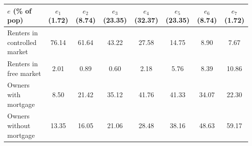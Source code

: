 \begin{table}[p]
\scriptsize
\renewcommand{\arraystretch}{1.2}
\begin{center}
\begin{tabular}{lccccccc}
\toprule
$e$ (\% of pop) & $e_{1}$ (1.72)& $e_{2}$ (8.74)& $e_{3}$ (23.35)& $e_{4}$ (32.37) &$e_{5}$ (23.35)&$e_{6}$ (8.74)&$e_{7}$ (1.72)\\ 
\midrule
Renters in controlled market & 76.14 & 61.64 & 43.22 & 27.58 & 14.75 & 8.90 & 7.67\\
Renters in free market & 2.01 & 0.89 & 0.60 & 2.18 & 5.76 & 8.39 & 10.86\\
Owners with mortgage & 8.50 & 21.42 & 35.12 & 41.76 & 41.33 & 34.07 & 22.30 \\
Owners without mortgage & 13.35 & 16.05 & 21.06 & 28.48 & 38.16 & 48.63 & 59.17 \\
\bottomrule
\end{tabular}
\end{center}
\normalsize
\end{table}
